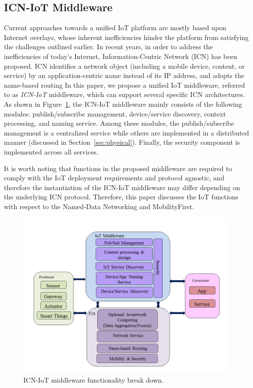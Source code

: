 \subsection{ICN-IoT Middleware}
Current approaches towards a unified IoT platform are mostly based upon Internet overlays, whose inherent inefficiencies hinder the platform from satisfying the challenges outlined earlier. In recent years, in order to address  the inefficiencies of today's Internet, Information-Centric Network (ICN) has been proposed. ICN identifies a network object (including a mobile device, content, or service) by an application-centric name instead of its IP address, and adopts the name-based routing
In this paper, we propose a unified IoT middleware, referred to as \emph{ICN-IoT} middleware, which can support several specific ICN architectures. As shown in Figure~\ref{fig:mid_arch}, the ICN-IoT middleware mainly consists of the following modules: publish/subscribe management, device/service discovery, context processing, and naming service. Among these modules, the publish/subscribe management is a centralized service while others are implemented in a distributed manner (discussed in Section~\ref{sec:physical}). Finally, the security component is implemented across all services.

It is worth noting that functions in the proposed middleware are required to comply with the IoT deployment requirements and protocol agnostic, and therefore the instantiation of the ICN-IoT middleware may differ depending on the underlying ICN protocol. Therefore, this paper discusses the IoT functions with respect to the Named-Data Networking and  MobilityFirst.
\vspace{-1mm}
\begin{figure}
\centering
\includegraphics[width=\columnwidth]{figure/middleware_architecture.png}
\caption{\label{fig:mid_arch} ICN-IoT middleware functionality break down.}
\end{figure}

